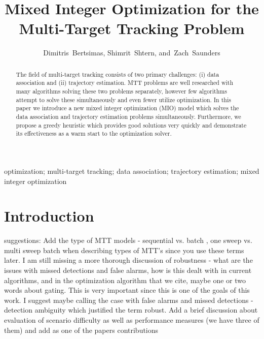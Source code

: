 \documentclass[journal]{IEEEtran}
\begin{document}
\title{Mixed Integer Optimization for the \\Multi-Target Tracking Problem}


\author{Dimitris~Bertsimas, Shimrit~Shtern, and~Zach~Saunders}

\maketitle

\begin{abstract}
The field of multi-target tracking consists of two primary challenges: (i) data association and (ii) trajectory estimation. MTT problems are well researched with many algorithms solving these two problems separately, however few algorithms attempt to solve these simultaneously and even fewer utilize optimization. In this paper we introduce a new mixed integer optimization (MIO) model which solves the data association and trajectory estimation problems simultaneously. Furthermore, we propose a greedy heuristic which provides good solutions very quickly and demonstrate its effectiveness as a warm start to the optimization solver. 
\end{abstract}

\begin{IEEEkeywords}
optimization; multi-target tracking; data association; trajectory estimation; mixed integer optimization 
\end{IEEEkeywords}

\section{Introduction}

{\color{red} suggestions: Add the type of MTT models - sequential vs. batch , one sweep vs. multi sweep batch when describing types of MTT's since you use these terms later. I am still missing a more thorough discussion of robustness - what are the issues with missed detections and false alarms, how is this dealt with in current algorithms, and in the optimization algorithm that we cite, maybe one or two words about gating. This is very important since this is one of the goals of this work. I suggest maybe calling the case with false alarms and missed detections - detection ambiguity which justified the term robust. Add a brief discussion about evaluation of scenario difficulty as well as performance measures (we have three of them) and add as one of the papers contributions}
\end{document}
